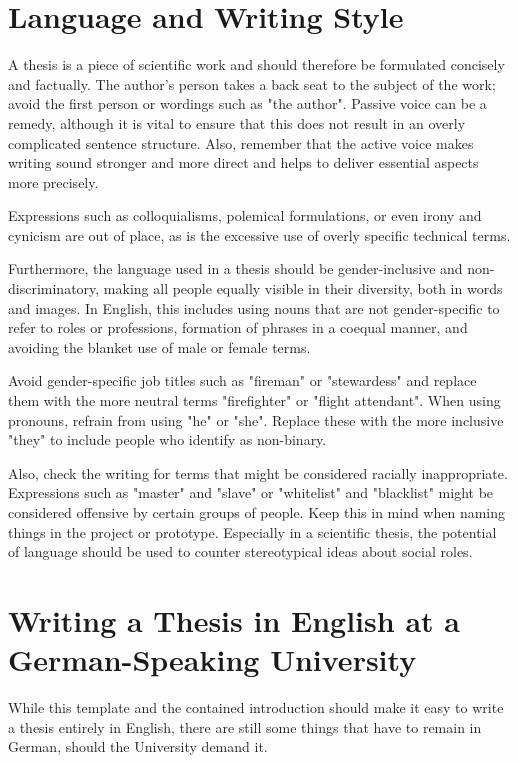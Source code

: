 \section{Language and Writing Style}

A thesis is a piece of scientific work and should therefore be formulated concisely 
and factually. The author's person takes a back seat to the subject of the
work; avoid the first person or wordings such as "the author". Passive voice can
be a remedy, although it is vital to ensure that this does not result in an
overly complicated sentence structure. Also, remember that the active voice
makes writing sound stronger and more direct and helps to deliver essential
aspects more precisely.

Expressions such as colloquialisms, polemical formulations, or even irony and
cynicism are out of place, as is the excessive use of overly specific technical
terms.

Furthermore, the language used in a thesis should be gender-inclusive and
non-discri\-minatory, making all people equally visible in their diversity,
both in words and images. In English, this includes using nouns that are not
gender-specific to refer to roles or professions, formation of phrases in a
coequal manner, and avoiding the blanket use of male or female terms.

Avoid gender-specific job titles such as "fireman" or "stewardess" and replace
them with the more neutral terms "firefighter" or "flight attendant". When
using pronouns, refrain from using "he" or "she". Replace these with the more
inclusive "they" to include people who identify as non-binary.

Also, check the writing for terms that might be considered racially
inappropriate. Expressions such as "master" and "slave" or "whitelist" and
"blacklist" might be considered offensive by certain groups of people. Keep this
in mind when naming things in the project or prototype. Especially in a
scientific thesis, the potential of language should be used to counter
stereotypical ideas about social roles.


\section{Writing a Thesis in English at a German-Speaking University}
\label{sec:german}

While this template and the contained introduction should make it easy to write
a thesis entirely in English, there are still some things that have to remain in
German, should the University demand it.

